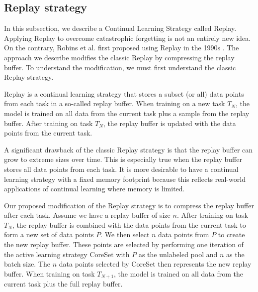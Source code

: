 \subsection{Replay strategy}
\label{sec:Methodology:ReplayStrategy}
In this subsection, we describe a Continual Learning Strategy called Replay. Applying Replay to overcome catastrophic forgetting is not an entirely new idea.
On the contrary, Robins et al. first proposed using Replay in the 1990s \cite{robins1995catastrophic}. The approach we describe modifies the classic Replay
by compressing the replay buffer. To understand the modification, we must first understand the classic Replay strategy. \par
Replay is a continual learning strategy that stores a subset (or all) data points from each task in a so-called replay buffer. When training on a new task
$T_N$, the model is trained on all data from the current task plus a sample from the replay buffer. After training on task $T_N$, the replay buffer is updated
with the data points from the current task. \par
A significant drawback of the classic Replay strategy is that the replay buffer can grow to extreme sizes over time. This is especially true when the replay
buffer stores all data points from each task. It is more desirable to have a continual learning strategy with a fixed memory footprint because this reflects
real-world applications of continual learning where memory is limited. \par
Our proposed modification of the Replay strategy is to compress the replay buffer after each task. Assume we have a replay buffer of size $n$. After
training on task $T_N$, the replay buffer is combined with the data points from the current task to form a new set of data points $P$. We then select $n$
data points from $P$ to create the new replay buffer. These points are selected by performing one iteration of the active learning strategy CoreSet
\cite{sener2017active} with $P$ as the unlabeled pool and $n$ as the batch size. The $n$ data points selected by CoreSet then represents the new replay buffer.
When training on task $T_{N+1}$, the model is trained on all data from the current task plus the full replay buffer.

